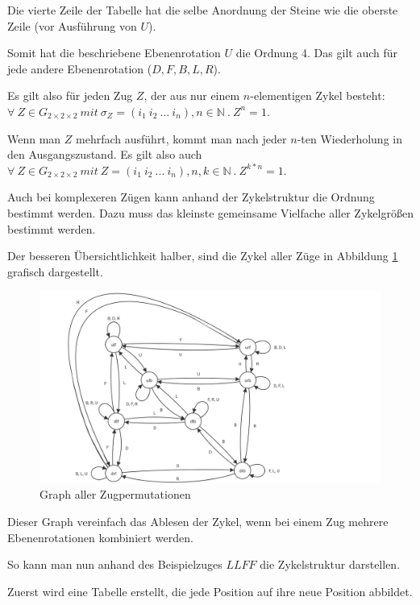 \documentclass[12pt,a4paper, usenames, dvipsnames]{article}
\newcommand{\Gtwo}{\ensuremath{G_{2\times 2\times 2}}}
\begin{document}
Die vierte Zeile der Tabelle hat die selbe Anordnung der Steine wie die oberste Zeile (vor Ausführung von $U$). 

Somit hat die beschriebene Ebenenrotation $U$ die Ordnung 4. Das gilt auch für jede andere Ebenenrotation ($D, F, B, L, R$).


Es gilt also für jeden Zug $Z$, der aus nur einem $n$-elementigen Zykel besteht: \\ 
${\forall \ Z \in \Gtwo\ mit \ \sigma_Z=(i_1 \ i_2 \ ... \ i_n), n \in \mathbb{N} \ . \  Z^n=1 }$. 


Wenn man $Z$ mehrfach ausführt, kommt man nach jeder $n$-ten Wiederholung in den Ausgangszustand. \cite{TD} Es gilt also auch 
${\forall \ Z \in \Gtwo\ mit \ Z=(i_1 \ i_2 \ ... \ i_n), n,k \in \mathbb{N} \ . \  Z^{k*n}=1 }$.


Auch bei komplexeren Zügen kann anhand der Zykelstruktur die Ordnung bestimmt werden. Dazu muss das kleinste gemeinsame Vielfache aller Zykelgrößen bestimmt werden. \cite{TD}

 
Der besseren Übersichtlichkeit halber, sind die Zykel aller Züge in Abbildung \ref{2} grafisch dargestellt.

\begin{figure}[h]
\includegraphics[scale=0.3]{graph_zug.png}
\caption[Graph aller Zugpermutationen]{Graph aller Zugpermutationen}
\label{2}
\end{figure}

Dieser Graph vereinfach das Ablesen der Zykel, wenn bei einem Zug mehrere Ebenenrotationen kombiniert werden. 


So kann man nun anhand des Beispielzuges $LLFF$ die Zykelstruktur darstellen. 


Zuerst wird eine Tabelle erstellt, die jede Position auf ihre neue Position abbildet. 
\end{document}
